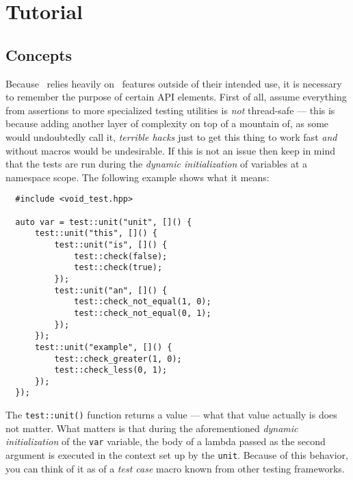 \section{Tutorial}

\subsection{Concepts}
Because \voidtest\ relies heavily on \cplusplus\ features outside of their
intended use, it is necessary to remember the purpose of certain API elements.
First of all, assume everything from assertions to more specialized testing
utilities is \textsl{not} thread-safe --- this is because adding another layer
of complexity on top of a mountain of, as some would undoubtedly call it, \textsl{terrible
hacks} just to get this thing to work fast \textsl{and} without macros would be
undesirable. If this is not an issue then keep in mind that the tests are run
during the \textsl{dynamic initialization} of variables at a namespace scope. The
following example shows what it means:
\begin{verbatim}
  #include <void_test.hpp>

  auto var = test::unit("unit", []() {
      test::unit("this", []() {
          test::unit("is", []() {
              test::check(false);
              test::check(true);
          });
          test::unit("an", []() {
              test::check_not_equal(1, 0);
              test::check_not_equal(0, 1);
          });
      });
      test::unit("example", []() {
          test::check_greater(1, 0);
          test::check_less(0, 1);
      });
  });
\end{verbatim}
The \verb!test::unit()! function returns a value --- what that value actually
is does not matter. What matters is that during the aforementioned
\textsl{dynamic initialization} of the \verb!var! variable, the body of a lambda
passed as the second argument is executed in the context set up by the
\verb!unit!. Because of this behavior, you can think of it as of a \textsl{test
case} macro known from other testing frameworks.


